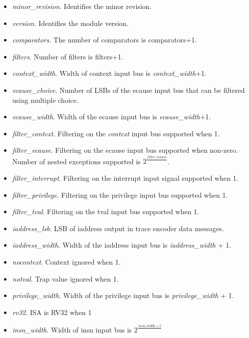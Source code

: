 \begin{itemize}
    \item \textit {minor\_revision}. Identifies the minor revision.
    \item \textit {version}. Identifies the module version.
    \item \textit {comparators}. The number of comparators is comparators+1.
    \item \textit {filters}. Number of filters is filters+1.
    \item \textit {context\_width}. Width of context input bus is \textit {context\_width}+1.
    \item \textit {ecause\_choice}. Number of LSBs of the ecause input bus that can be filtered using multiple choice.
    \item \textit {ecause\_width}. Width of the ecause input bus is \textit {ecause\_width}+1.
    \item \textit {filter\_context}. Filtering on the \textit {context} input bus supported when 1.
    \item \textit {filter\_ecause}. Filtering on the ecause input bus supported when non-zero.  Number of nested exceptions supported is $2^\frac{\textit {filter\_ecause}}{}$.
    \item \textit {filter\_interrupt}. Filtering on the interrupt input signal supported when 1.
    \item \textit {filter\_privilege}. Filtering on the privilege input bus supported when 1.
    \item \textit {filter\_tval}. Filtering on the tval input bus supported when 1.
    \item \textit {iaddress\_lsb}. LSB of iaddress output in trace encoder data messages.
    \item \textit {iaddress\_width}. Width of the iaddress input bus is \textit {iaddress\_width} + 1.
    \item \textit {nocontext}. Context ignored when 1.
    \item \textit {notval}. Trap value ignored when 1.
    \item \textit {privilege\_width}. Width of the privilege input bus is \textit {privilege\_width} + 1.
    \item \textit {rv32}. ISA is RV32 when 1
    \item \textit {insn\_width}. Width of insn input bus is $2^\frac{\textit {insn\_width}+5}{}$
\end{itemize}
